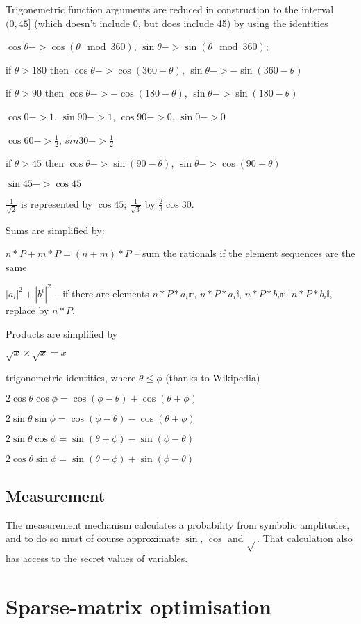 Trigonemetric function arguments are reduced in construction to the interval $(0,45]$ (which doesn't include 0, but does include 45) by using the identities
\begin{itemize*}
\item $\cos\theta->\cos{(\theta\mod360)}$, $\sin\theta->\sin{(\theta\mod360)}$;
\item if $\theta>180$ then $\cos\theta-> \cos{(360-\theta)}$, $\sin\theta-> -\sin{(360-\theta)}$
\item if $\theta>90$ then $\cos\theta-> -\cos{(180-\theta)}$, $\sin\theta-> \sin{(180-\theta)}$
\item $\cos0->1$, $\sin90->1$, $\cos{90}->0$, $\sin0->0$
\item $\cos60->\frac{1}{2}$, $sin30->\frac{1}{2}$
\item if $\theta>45$ then $\cos\theta->\sin{(90-\theta)}$, $\sin\theta->\cos{(90-\theta)}$
\item $\sin45->\cos45$
\end{itemize*}
 
$\frac{1}{\sqrt2}$ is represented by $\cos{45}$; $\frac{1}{\sqrt3}$ by $\frac{2}{3}\cos{30}$.

Sums are simplified by:
\begin{itemize*}
\item $n*P+m*P=(n+m)*P$ -- sum the rationals if the element sequences are the same
\item $|a_{i}|^{2}+|b^{i}|^{2}$ -- if there are elements $n*P*a_{i}\mathbb{r}$, $n*P*a_{i}\mathbb{i}$, $n*P*b_{i}\mathbb{r}$, $n*P*b_{i}\mathbb{i}$, replace by $n*P$.
\end{itemize*}

Products are simplified by
\begin{itemize*}
\item $\sqrt{x}\times\sqrt{x}=x$
\item trigonometric identities, where $\theta\leq\phi$ (thanks to Wikipedia)
\begin{itemize*}
\item $2\cos\theta\cos\phi = \cos(\phi-\theta)+\cos(\theta+\phi)$
\item $2\sin\theta\sin\phi = \cos(\phi-\theta)-\cos(\theta+\phi)$
\item $2\sin\theta\cos\phi = \sin(\theta+\phi)-\sin(\phi-\theta)$
\item $2\cos\theta\sin\phi = \sin(\theta+\phi)+\sin(\phi-\theta)$
\end{itemize*}
\end{itemize*}

\subsection{Measurement}

The measurement mechanism calculates a probability from symbolic amplitudes, and to do so must of course approximate $\sin{}$, $\cos{}$ and $\sqrt{}$. That calculation also has access to the secret values of variables.

\section{Sparse-matrix optimisation}